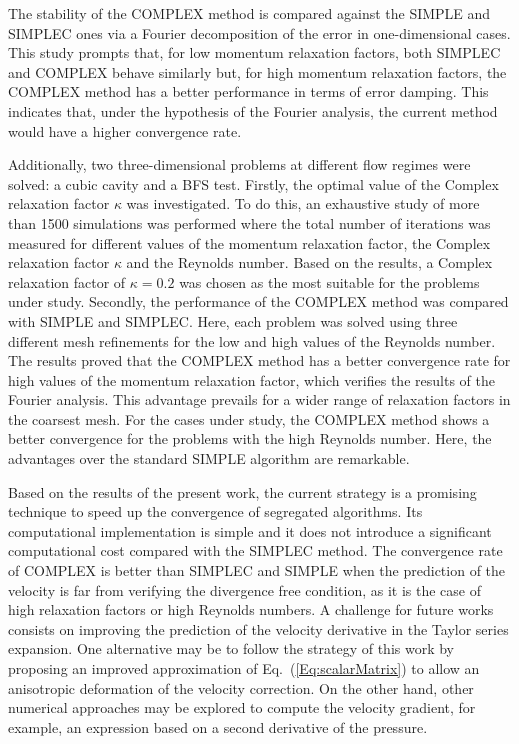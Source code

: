 \documentclass[final,3p,times,11pt,onecolumn]{myElsarticle}
\numberwithin{equation}{section}
\begin{document}
The stability of the COMPLEX method is compared against the SIMPLE and SIMPLEC ones via a Fourier decomposition of the error in one-dimensional cases. This study prompts that, for low momentum relaxation factors, both SIMPLEC and COMPLEX behave similarly but, for high momentum relaxation factors, the COMPLEX method has a better performance in terms of error damping. This indicates that, under the hypothesis of the Fourier analysis, the current method would have a higher convergence rate.

Additionally, two three-dimensional problems at different flow regimes were solved: a cubic cavity and a BFS test. Firstly, the optimal value of the Complex relaxation factor $\kappa$ was investigated. To do this, an exhaustive study of more than 1500 simulations was performed where the total number of iterations was measured for different values of the momentum relaxation factor, the Complex relaxation factor $\kappa$ and the Reynolds number. Based on the results, a Complex relaxation factor of $\kappa = 0.2$ was chosen as the most suitable for the problems under study. Secondly, the performance of the COMPLEX method was compared with SIMPLE and SIMPLEC. Here, each problem was solved using three different mesh refinements for the low and high values of the Reynolds number. The results proved that the COMPLEX method has a better convergence rate for high values of the momentum relaxation factor, which verifies the results of the Fourier analysis. This advantage prevails for a wider range of relaxation factors in the coarsest mesh. For the cases under study, the COMPLEX method shows a better convergence for the problems with the high Reynolds number. Here, the advantages over the standard SIMPLE algorithm are remarkable.

Based on the results of the present work, the current strategy is a promising technique to speed up the convergence of segregated algorithms. Its computational implementation is simple and it does not introduce a significant computational cost compared with the SIMPLEC method. The convergence rate of COMPLEX is better than SIMPLEC and SIMPLE when the prediction of the velocity is far from verifying the divergence free condition, as it is the case of high relaxation factors or high Reynolds numbers. 
A challenge for future works consists on improving the prediction of the velocity derivative in the Taylor series expansion. One alternative may be to follow the strategy of this work by proposing an improved  approximation of Eq.~(\ref{Eq:scalarMatrix}) to allow an anisotropic deformation of the velocity correction. On the other hand, other numerical approaches may be explored to compute the velocity gradient, for example, an expression based on a second derivative of the pressure. 



\end{document}
